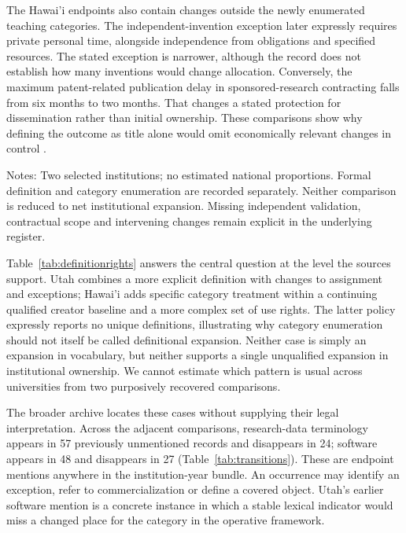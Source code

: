 \documentclass[12pt]{article}
\begin{document}
The Hawai'i endpoints also contain changes outside the newly enumerated teaching categories. The independent-invention exception later expressly requires private personal time, alongside independence from obligations and specified resources. The stated exception is narrower, although the record does not establish how many inventions would change allocation. Conversely, the maximum patent-related publication delay in sponsored-research contracting falls from six months to two months. That changes a stated protection for dissemination rather than initial ownership. These comparisons show why defining the outcome as title alone would omit economically relevant changes in control \citep[IV.2 and IV.8]{hawaii1985} \citep[III.C.4 and III.C.8]{hawaii2020}.

\begin{table}[htbp]
\centering\caption{Naming knowledge and changing rights: case-level conclusions}\label{tab:definitionrights}
\small
\par\smallskip\footnotesize\raggedright Notes: Two selected institutions; no estimated national proportions. Formal definition and category enumeration are recorded separately. Neither comparison is reduced to net institutional expansion. Missing independent validation, contractual scope and intervening changes remain explicit in the underlying register.
\end{table}

Table~\ref{tab:definitionrights} answers the central question at the level the sources support. Utah combines a more explicit definition with changes to assignment and exceptions; Hawai'i adds specific category treatment within a continuing qualified creator baseline and a more complex set of use rights. The latter policy expressly reports no unique definitions, illustrating why category enumeration should not itself be called definitional expansion. Neither case is simply an expansion in vocabulary, but neither supports a single unqualified expansion in institutional ownership. We cannot estimate which pattern is usual across universities from two purposively recovered comparisons.

The broader archive locates these cases without supplying their legal interpretation. Across the \Pairs{} adjacent comparisons, research-data terminology appears in 57 previously unmentioned records and disappears in 24; software appears in 48 and disappears in 27 (Table~\ref{tab:transitions}). These are endpoint mentions anywhere in the institution-year bundle. An occurrence may identify an exception, refer to commercialization or define a covered object. Utah's earlier software mention is a concrete instance in which a stable lexical indicator would miss a changed place for the category in the operative framework.
\end{document}
